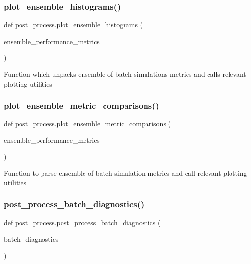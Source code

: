 \subsubsection{\texorpdfstring{plot\_ensemble\_histograms()}{plot\_ensemble\_histograms()}}
{\footnotesize\ttfamily def post\+\_\+process.\+plot\+\_\+ensemble\+\_\+histograms (\begin{DoxyParamCaption}\item[{}]{ensemble\+\_\+performance\+\_\+metrics }\end{DoxyParamCaption})}

\begin{DoxyVerb}Function which unpacks ensemble of batch simulations metrics and calls relevant plotting utilities
\end{DoxyVerb}
 \mbox{\label{namespacepost__process_a1c9f01d3b7c28ba49dfc907d77a129e0}} 
\subsubsection{\texorpdfstring{plot\_ensemble\_metric\_comparisons()}{plot\_ensemble\_metric\_comparisons()}}
{\footnotesize\ttfamily def post\+\_\+process.\+plot\+\_\+ensemble\+\_\+metric\+\_\+comparisons (\begin{DoxyParamCaption}\item[{}]{ensemble\+\_\+performance\+\_\+metrics }\end{DoxyParamCaption})}

\begin{DoxyVerb}Function to parse ensemble of batch simulation metrics and call relevant plotting utilities
\end{DoxyVerb}
 \mbox{\label{namespacepost__process_a5b319220652a268ee1dcbb710f38b420}} 
\subsubsection{\texorpdfstring{post\_process\_batch\_diagnostics()}{post\_process\_batch\_diagnostics()}}
{\footnotesize\ttfamily def post\+\_\+process.\+post\+\_\+process\+\_\+batch\+\_\+diagnostics (\begin{DoxyParamCaption}\item[{}]{batch\+\_\+diagnostics }\end{DoxyParamCaption})}

